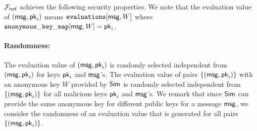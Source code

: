 	$ \mathcal{F}_{\textsf{rvrf}} $  achieves the following security properties. We note that  the evaluation value of $ (\mathsf{msg}, \mathsf{pk}_i) $ means $ \texttt{evaluations}[\mathsf{msg},W] $ where $ \mathtt{anonymous\_key\_map}[\mathsf{msg},W] = \mathsf{pk}_i $.
	
	\paragraph{Randomness:}  The evaluation value of $ (\mathsf{msg}, \mathsf{pk}_i) $ is randomly selected independent from $ (\mathsf{msg}, \mathsf{pk}_i) $ for keys $ \mathsf{pk}_i $ and $ \mathsf{msg} $'s. The evaluation value of pairs  $ \{(\mathsf{msg}, \mathsf{pk}_i)\} $  with an anonymous key $ W $ provided by $ \mathsf{Sim} $  is randomly selected independent from $ \{(\mathsf{msg}, \mathsf{pk}_i)\} $ for all malicious keys $ \mathsf{pk}_i  $ and $ \mathsf{msg} $'s. We remark that since $ \mathsf{Sim} $ can provide the same anonymous key for different public keys for a message $ \mathsf{msg} $, we  consider the randomness of an evaluation value that is generated for all pairs $ \{(\mathsf{msg}, \mathsf{pk}_i)\} $.
	
